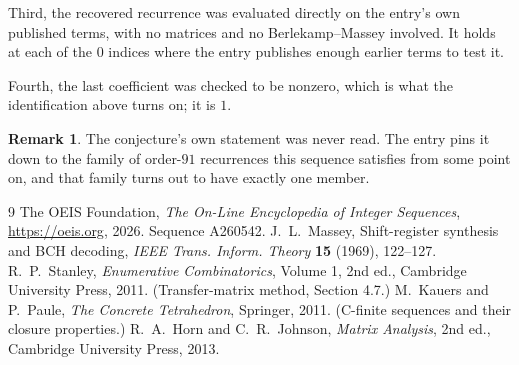 \documentclass[11pt,a4paper]{article}
\theoremstyle{plain}
\theoremstyle{definition}
\newtheorem{remark}[theorem]{Remark}
\begin{document}
Third, the recovered recurrence was evaluated directly on the entry's own published terms, with
no matrices and no Berlekamp--Massey involved. It holds at each of the $0$ indices where
the entry publishes enough earlier terms to test it.

Fourth, the last coefficient was checked to be nonzero, which is what the identification above
turns on; it is $1$.

\begin{remark}
The conjecture's own statement was never read. The entry pins it down to the family of
order-$91$ recurrences this sequence satisfies from some point on, and that family turns
out to have exactly one member.
\end{remark}

\begin{thebibliography}{9}
 The OEIS Foundation, \emph{The On-Line Encyclopedia of Integer
Sequences}, \url{https://oeis.org}, 2026. Sequence A260542.
 J.~L.~Massey, Shift-register synthesis and BCH decoding, \emph{IEEE
Trans. Inform. Theory} \textbf{15} (1969), 122--127.
 R.~P.~Stanley, \emph{Enumerative Combinatorics}, Volume 1, 2nd ed.,
Cambridge University Press, 2011. (Transfer-matrix method, Section 4.7.)
 M.~Kauers and P.~Paule, \emph{The Concrete Tetrahedron}, Springer, 2011.
(C-finite sequences and their closure properties.)
 R.~A.~Horn and C.~R.~Johnson, \emph{Matrix Analysis}, 2nd ed., Cambridge
University Press, 2013.
\end{thebibliography}
\end{document}
